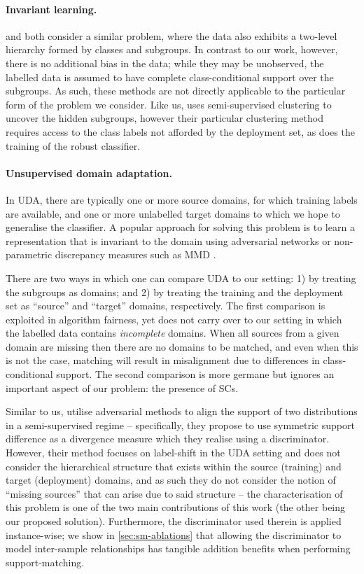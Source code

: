 \paragraph{Invariant learning.}
%
\citet{SohDunAngGuetal20} and \citet{creager2021environment} both consider a similar problem, where
the data also exhibits a two-level hierarchy formed by classes and subgroups.
%
In contrast to our work, however, there is no additional bias in the data; while they may be
unobserved, the labelled data is assumed to have complete class-conditional support over the
subgroups.
%
As such, these methods are not directly applicable to the particular form of the problem we
consider.
%
Like us, \citet{SohDunAngGuetal20} uses semi-supervised clustering to uncover the hidden subgroups,
however their particular clustering method requires access to the class labels not afforded by the
deployment set, as does the training of the robust classifier.

\paragraph{Unsupervised domain adaptation.}
%
In \acf{UDA}, there are typically one or more source domains, for which training labels are
available, and one or more unlabelled target domains to which we hope to generalise the classifier.
%
A popular approach for solving this problem is to learn a representation that is invariant to the
domain using adversarial networks \citep{ganin2016domain} or non-parametric discrepancy measures
such as \ac{MMD} \citep{gretton2012kernel}.
%

There are two ways in which one can compare UDA to our setting: 1) by treating the subgroups as
domains; and 2) by treating the training and the deployment set as ``source'' and ``target''
domains, respectively.
%
The first comparison is exploited in algorithm fairness, yet does not carry over to our setting in
which the labelled data contains \emph{incomplete} domains. 
%
When all sources from a given domain are missing then there are no domains to be matched, and even
when this is not the case, matching will result in misalignment due to differences in
class-conditional support.
%
The second comparison is more germane but ignores an important aspect of our problem: the presence
of \acp{SC}.
%

Similar to us, \citet{tong2022adversarial} utilise adversarial methods to align the support of two
distributions in a semi-supervised regime -- specifically, they propose to use symmetric support
difference as a divergence measure which they realise using a discriminator. 
%
However, their method focuses on label-shift in the \ac{UDA} setting and does not consider the
hierarchical structure that exists within the source (training) and target (deployment) domains,
and as such they do not consider the notion of ``missing sources'' that can arise due to said
structure -- the characterisation of this problem is one of the two main contributions of this work
(the other being our proposed solution). 
%
Furthermore, the discriminator used therein is applied instance-wise; we show in
\ref{sec:sm-ablations} that allowing the discriminator to model inter-sample relationships has
tangible addition benefits when performing support-matching.

